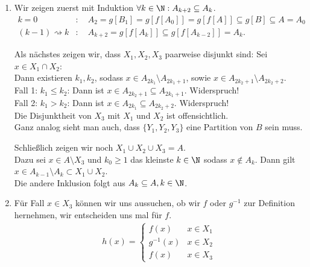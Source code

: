 \begin{solution}

\phantom{}
\begin{enumerate}[label = \alph*.]
  \item Wir zeigen zuerst mit Induktion $\forall k \in \N: A_{k+2} \subseteq A_{k}$.
  \begin{align*}
    k = 0&: \quad A_2 = g[B_1] = g[f[A_0]] = g[f[A]] \subseteq g[B] \subseteq A = A_0 \\
    (k-1) \rightsquigarrow k&: \quad
    A_{k+2} = g[f[A_{k}]] \subseteq g[f[A_{k-2}]] = A_{k}.
  \end{align*}

  Als nächstes zeigen wir, dass $X_1,X_2,X_3$ paarweise disjunkt sind:
  Sei $x \in X_1 \cap X_2$: \\
  Dann existieren $k_1, k_2$, sodass $x \in A_{2k_1}\setminus A_{2k_1+1}$, sowie
  $x \in A_{2k_2 + 1}\setminus A_{2k_2+2}$. \\
  Fall 1: $k_1 \leq k_2$: Dann ist $x \in A_{2k_2 + 1} \subseteq A_{2k_1 + 1}$. Widerspruch! \\
  Fall 2: $k_1 > k_2$: Dann ist $x \in A_{2k_1} \subseteq A_{2k_2 + 2}$. Widerspruch! \\
  Die Disjunktheit von $X_3$ mit $X_1$ und $X_2$ ist offensichtlich. \\
  Ganz analog sieht man auch, dass $\{Y_1,Y_2,Y_3\}$ eine Partition von $B$ sein muss.

  Schließlich zeigen wir noch $X_1 \cup X_2 \cup X_3 = A$. \\
  Dazu sei $x \in A \setminus X_3$ und $k_0 \geq 1$ das kleinste $k \in \N$ sodass
  $x \notin A_k$. Dann gilt $x \in A_{k-1} \setminus A_k \subset X_1 \cup X_2$. \\
  Die andere Inklusion folgt aus $A_k \subseteq A, k \in \N$.

  \item
  Für Fall $x \in X_3$ können wir uns aussuchen, ob wir $f$ oder $g^{-1}$
  zur Definition hernehmen, wir entscheiden uns mal für $f$.
  \begin{align*}
    h(x) = \begin{cases}
      f(x) & x \in X_1 \\
      g^{-1}(x) & x \in X_2 \\
      f(x) & x \in X_3
    \end{cases}
  \end{align*}


\end{enumerate}
\end{solution}
